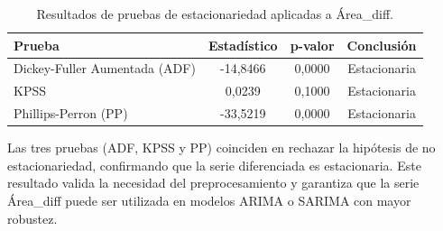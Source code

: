 \begin{table}[H]
    \centering
    \caption{Resultados de pruebas de estacionariedad aplicadas a Área\_diff.}
    \label{tab:ru_area_diff}
    \begin{tabular}{lccc}
        \toprule
        \textbf{Prueba} & \textbf{Estadístico} & \textbf{p-valor} & \textbf{Conclusión} \\
        \midrule
        Dickey-Fuller Aumentada (ADF) & -14,8466 & 0,0000 & Estacionaria \\
        KPSS & 0,0239 & 0,1000 & Estacionaria \\
        Phillips-Perron (PP) & -33,5219 & 0,0000 & Estacionaria \\
        \bottomrule
    \end{tabular}
\end{table}

Las tres pruebas (ADF, KPSS y PP) coinciden en rechazar la hipótesis de no estacionariedad, 
confirmando que la serie diferenciada es estacionaria. Este resultado valida la 
necesidad del preprocesamiento y garantiza que la serie Área\_diff puede ser utilizada en 
modelos ARIMA o SARIMA con mayor robustez. 



